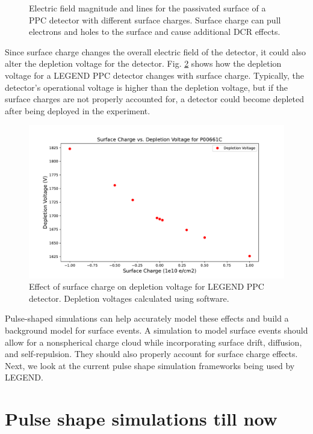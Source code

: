 \begin{figure}
\caption{Electric field magnitude and lines for the passivated surface of a PPC detector with different surface charges. Surface charge can pull electrons and holes to the surface and cause additional DCR effects.}
\label{ch3_fig_surface_field_sc0}
\end{figure}


Since surface charge changes the overall electric field of the detector, it could also alter the depletion voltage for the detector. Fig. \ref{ch3_fig_deplection_sc} shows how the depletion voltage for a LEGEND PPC detector changes with surface charge. Typically, the detector's operational voltage is higher than the depletion voltage, but if the surface charges are not properly accounted for, a detector could become depleted after being deployed in the experiment.

\begin{figure}[!htb]
\centering
  \includegraphics[width=0.99\linewidth]{ch3/figs/deplep_sc.pdf}
 \caption{Effect of surface charge on depletion voltage for LEGEND PPC detector. Depletion voltages calculated using {\siggen} software.}
\label{ch3_fig_deplection_sc}
  \end{figure}

Pulse-shaped simulations can help accurately model these effects and build a background model for surface events. A simulation to model surface events should allow for a nonspherical charge cloud while incorporating surface drift, diffusion, and self-repulsion. They should also properly account for surface charge effects. Next, we look at the current pulse shape simulation frameworks being used by LEGEND.

\section{Pulse shape simulations till now}

